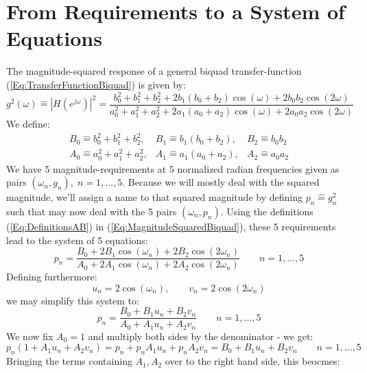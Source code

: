 \section{From Requirements to a System of Equations}
The magnitude-squared response of a general biquad transfer-function (\ref{Eq:TransferFunctionBiquad}) is given by:
\begin{equation}
\label{Eq:MagnitudeSquaredBiquad}
 g^2(\omega) 
 \hat{=} |H(e^{j \omega})|^2
 = \frac{b_0^2 + b_1^2 + b_2^2 + 2 b_1 (b_0 + b_2) \cos(\omega) + 2 b_0 b_2 \cos(2 \omega)}
        {a_0^2 + a_1^2 + a_2^2 + 2 a_1 (a_0 + a_2) \cos(\omega) + 2 a_0 a_2 \cos(2 \omega)}
\end{equation}
We define:
\begin{eqnarray}
\label{Eq:DefinitionsAB}
 B_0 \hat{=} b_0^2 + b_1^2 + b_2^2, & B_1 \hat{=} b_1 (b_0 + b_2), & B_2 \hat{=} b_0 b_2 \nonumber\\
 A_0 \hat{=} a_0^2 + a_1^2 + a_2^2, & A_1 \hat{=} a_1 (a_0 + a_2), & A_2 \hat{=} a_0 a_2
\end{eqnarray}
We have 5 magnitude-requirements at 5 normalized radian frequencies given as pairs $(\omega_n, g_n), \; n=1,\ldots,5$. Because we will mostly deal with the squared magnitude, we'll assign a name to that squared magnitude by defining $p_n \hat{=} g_n^2$ such that may now deal with the 5 pairs $(\omega_n, p_n)$.
Using the definitions (\ref{Eq:DefinitionsAB}) in (\ref{Eq:MagnitudeSquaredBiquad}), these 5 requirements lead to the system of 5 equations:
\begin{equation}
 p_n = \frac{B_0 + 2 B_1 \cos(\omega_n) + 2 B_2 \cos(2 \omega_n)}
            {A_0 + 2 A_1 \cos(\omega_n) + 2 A_2 \cos(2 \omega_n)} \qquad n = 1, \ldots, 5
\end{equation}
Defining furthermore:
\begin{equation}
\label{Eq:DefinitionsUV}
 u_n = 2 \cos(\omega_n), \qquad v_n = 2 \cos(2 \omega_n)
\end{equation}
we may simplify this system to:
\begin{equation}
\label{Eq:MagnitudeSquaredSimplified}
 p_n = \frac{B_0 + B_1 u_n + B_2 v_n}
            {A_0 + A_1 u_n + A_2 v_n} \qquad n = 1, \ldots, 5
\end{equation}
We now fix $A_0 = 1$ and multiply both sides by the denominator - we get:
\begin{equation}
 p_n (1 + A_1 u_n + A_2 v_n) = p_n + p_n A_1 u_n + p_n A_2 v_n = B_0 + B_1 u_n + B_2 v_n \qquad n = 1, \ldots, 5
\end{equation}
Bringing the terms containing $A_1, A_2$ over to the right hand side, this beocmes:
